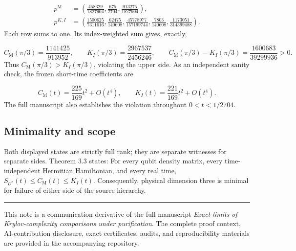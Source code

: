 \documentclass[11pt,a4paper]{article}
\begin{document}
\[
\begin{aligned}
p^{\mathrm M}&=\left(\frac{458329}{1827904},\frac{675}{2704},\frac{913275}{1827904}\right),\\[3pt]
p^{K,I}&=\left(\frac{1500625}{7311616},\frac{62475}{140608},
\frac{45778977}{157199744},\frac{7803}{140608},\frac{1173051}{314399488}\right).
\end{aligned}
\]
Each row sums to one. Its index-weighted sum gives, exactly,

\[
C_{\mathrm M}(\pi/3)=\frac{1141425}{913952},\qquad
K_I(\pi/3)=\frac{2967537}{2456246},\qquad
C_{\mathrm M}(\pi/3)-K_I(\pi/3)=\frac{1600683}{39299936}>0.
\]
Thus $C_{\mathrm M}(\pi/3)>K_I(\pi/3)$, violating the upper side.
As an independent sanity check, the frozen short-time coefficients are

\[
C_{\mathrm M}(t)=\frac{225}{169}t^2+O(t^4),\qquad
K_I(t)=\frac{221}{169}t^2+O(t^4).
\]
The full manuscript also establishes the violation throughout $0<t<1/2704$.

\subsection*{Minimality and scope}
Both displayed states are strictly full rank; they are separate witnesses for
separate sides. Theorem 3.3 states: For every qubit density matrix, every
time-independent Hermitian Hamiltonian, and every real time,
$S_{U^*}(t)\le C_{\mathrm M}(t)\le K_I(t)$. Consequently, physical dimension three
is minimal for failure of either side of the source hierarchy.

\vspace{3pt}\hrule\vspace{4pt}
{\small This note is a communication derivative of the full manuscript
\emph{Exact limits of Krylov-complexity comparisons under purification}.
The complete proof context, AI-contribution disclosure, exact certificates, audits,
and reproducibility materials are provided in the accompanying repository.}
\end{document}
